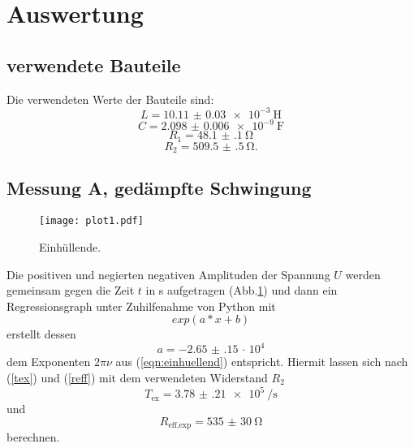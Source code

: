 \section{Auswertung}
\label{sec:Auswertung}

\subsection{verwendete Bauteile}

Die verwendeten Werte der Bauteile sind:
\begin{equation*}
  L = \SI{10.11(3)e-3}{\henry}
\end{equation*}
\begin{equation*}
  C = \SI{2.098(6)e-9}{\farad}
\end{equation*}
\begin{equation*}
  R_{\text{1}} = \SI{48.1(1)}{\ohm}
\end{equation*}
\begin{equation*}
  R_{\text{2}} = \SI{509.5(5)}{\ohm}.
\end{equation*}

\subsection{Messung A, gedämpfte Schwingung}

\begin{figure}
  \centering
  \texttt{[image: plot1.pdf]}
  \caption{Einhüllende.}
  \label{fig:plot1}
\end{figure}
 Die positiven und negierten negativen Amplituden der Spannung $U$ werden gemeinsam
gegen die Zeit $t$ in s aufgetragen (Abb.\ref{fig:plot1}) und dann ein Regressionsgraph
unter Zuhilfenahme von Python mit
\begin{equation*}
  exp(a*x +b)
\end{equation*}
erstellt dessen
\begin{equation*}
   a = \num{-2.65(15)}\, \cdot\, 10^{4}
\end{equation*}
dem Exponenten $2\pi\nu$ aus (\ref{eqn:einhuellend}) entspricht.
Hiermit lassen sich nach (\ref{tex}) und (\ref{reff}) mit dem verwendeten Widerstand $R_{\text{2}}$
\begin{equation*}
   T_{\text{ex}} = \SI{3.78(21)e5}{\per\second}
\end{equation*}
und
\begin{equation*}
R_{\text{eff,exp}} = \SI{535(30)}{\ohm}
\end{equation*}
berechnen.

